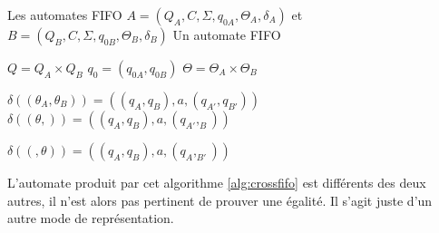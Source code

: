 \begin{algo}\label{alg:crossfifo}
 \begin{algorithmic}[1]
   \REQUIRE Les automates FIFO $A=(Q_A,C,\Sigma,q_{0A}, \Theta_A,\delta_A)$ et $B=(Q_B,C,\Sigma,q_{0B},\Theta_B,\delta_B)$
   \ENSURE Un automate FIFO \fifo

   \STATE $Q=Q_A\times Q_B$
   \STATE $q_0 = (q_{0A},q_{0B})$ 
   \STATE $\Theta=\Theta_A \times \Theta_B$

        \STATE $\delta((\theta_A, \theta_B))=((q_A,q_B),a,(q_{A'},q_{B'}))$
      \ENDFOR
    \ENDFOR
        \STATE  $\delta((\theta,))=((q_A,q_B),a,(q_{A'},_B))$
      \ENDFOR
    \ENDFOR

        \STATE  $\delta((,\theta))=((q_A,q_B),a,(q_A,_{B'}))$
      \ENDFOR
    \ENDFOR

   \ENDFOR


   \RETURN \fifo
 \end{algorithmic}
\end{algo}

L'automate produit par cet algorithme \ref{alg:crossfifo} est différents des deux autres, il n'est alors pas pertinent de prouver une égalité. Il s'agit juste d'un autre mode de représentation.


